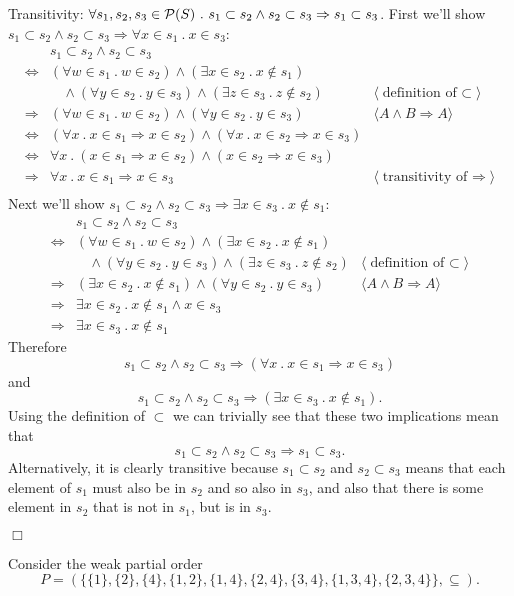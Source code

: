 \documentclass[11pt,fleqn]{article}
\newcommand{\sglsp}{\ }
\newenvironment{proof}{\par\noindent{\bf Proof\sglsp}}{\hfill$\Box$}
\newcommand{\pnote}[1]{{\langle \text{#1} \rangle}}
\newcommand{\sP}{\mbox{$\cal P$}}
\newcommand{\set}[1]{{\{ #1 \}}}
\begin{document}
\begin{proof}
	Transitivity: $\forall s_1,s_2,s_3 \in \sP(S) ~.~ s_1 \subset s_2 \wedge s_2 \subset s_3 \Rightarrow s_1 \subset s_3$.
	First we'll show $s_1 \subset s_2 \wedge s_2 \subset s_3 \Rightarrow \forall x \in s_1 ~.~ x \in s_3 $:
	\begin{align*}
		& s_1 \subset s_2 \wedge s_2 \subset s_3 & \\
		\iff & (\forall w \in s_1 ~.~ w \in s_2) \wedge (\exists x \in s_2 ~.~ x \not\in s_1) & \\
		&~~~~\wedge (\forall y \in s_2 ~.~ y \in s_3) \wedge (\exists z \in s_3 ~.~ z \not\in s_2) & \pnote{definition of $\subset$} \\
		\Rightarrow & (\forall w \in s_1 ~.~ w \in s_2) \wedge (\forall y \in s_2 ~.~ y \in s_3) & \pnote{$A \wedge B \Rightarrow A$} \\
		\iff & (\forall x ~.~ x \in s_1 \Rightarrow x \in s_2) \wedge (\forall x ~.~ x \in s_2 \Rightarrow x \in s_3) & \\
		\iff & \forall x ~.~ (x \in s_1 \Rightarrow x \in s_2) \wedge (x \in s_2 \Rightarrow x \in s_3) & \\
		\Rightarrow & \forall x ~.~ x \in s_1 \Rightarrow x \in s_3 & \pnote{transitivity of $\Rightarrow$} \\
	\end{align*}
	Next we'll show $s_1 \subset s_2 \wedge s_2 \subset s_3 \Rightarrow \exists x \in s_3 ~.~ x \not\in s_1 $:
	\begin{align*}
		& s_1 \subset s_2 \wedge s_2 \subset s_3 & \\
		\iff & (\forall w \in s_1 ~.~ w \in s_2) \wedge (\exists x \in s_2 ~.~ x \not\in s_1) & \\
		&~~~~\wedge (\forall y \in s_2 ~.~ y \in s_3) \wedge (\exists z \in s_3 ~.~ z \not\in s_2) & \pnote{definition of $\subset$} \\
		\Rightarrow & (\exists x \in s_2 ~.~ x \not\in s_1) \wedge (\forall y \in s_2 ~.~ y \in s_3) & \pnote{$A \wedge B \Rightarrow A$} \\
		\Rightarrow & \exists x \in s_2 ~.~ x \not\in s_1 \wedge x \in s_3 & \\
		\Rightarrow & \exists x \in s_3 ~.~ x \not\in s_1 &
	\end{align*}
	Therefore \[s_1 \subset s_2 \wedge s_2 \subset s_3 \Rightarrow (\forall x ~.~ x \in s_1 \Rightarrow x \in s_3)\] and 
	\[s_1 \subset s_2 \wedge s_2 \subset s_3 \Rightarrow (\exists x \in s_3 ~.~ x \not\in s_1).\]
	Using the definition of $\subset$ we can trivially see that these two implications mean that \[s_1 \subset s_2 \wedge s_2 \subset s_3 \Rightarrow s_1 \subset s_3.\]
	Alternatively, it is clearly transitive because $s_1 \subset s_2$ and $s_2 \subset s_3$ means that each element of $s_1$ must also be in $s_2$ and so also in $s_3$, and also that there is some element in $s_2$ that is not in $s_1$, but is in $s_3$.

	\end{proof}
  \item  Consider the weak partial order \[P =
    (\set{\set{1}, \set{2}, \set{4}, \set{1,2}, \set{1,4}, \set{2,4},
    \set{3,4}, \set{1,3,4}, \set{2,3,4}}, \subseteq).\]
\end{document}
